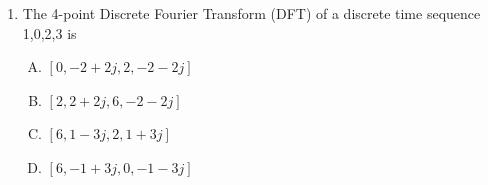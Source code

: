 \documentclass[journal,12pt,twocolumn]{IEEEtran}
\begin{document}
\begin{enumerate}
\item The 4-point Discrete Fourier Transform (DFT) of a discrete time sequence {1,0,2,3} is\\
\begin{enumerate}[(A)]

\setlength\itemsep{1em}

\item $[0,-2+2j,2,-2-2j]$
\item $[2,2+2j,6,-2-2j]$
\item $[6,1-3j,2,1+3j]$
\item $[6,-1+3j,0,-1-3j]$

\end{enumerate}

\end{enumerate}
\end{document}
